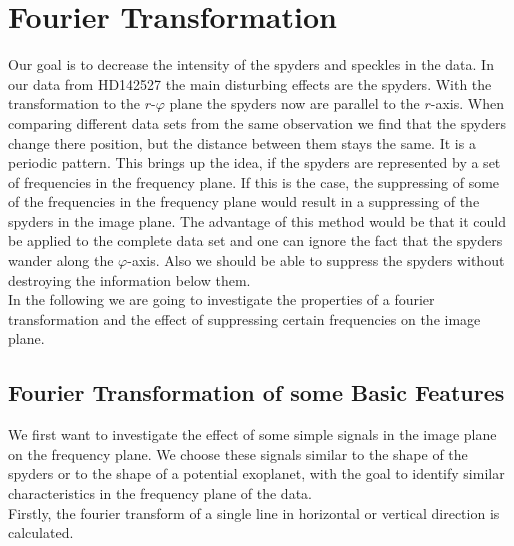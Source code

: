 \section{Fourier Transformation}
Our goal is to decrease the intensity of the spyders and speckles in the data. In our data from HD142527 the main disturbing effects are the spyders. With the transformation to the $r$-$\varphi$ plane the spyders now are parallel to the $r$-axis. When comparing different data sets from the same observation we find that the spyders change there position, but the distance between them stays the same. It is a periodic pattern. This brings up the idea, if the spyders are represented by a set of frequencies in the frequency plane. If this is the case, the suppressing of some of the frequencies in the frequency plane would result in a suppressing of the spyders in the image plane. The advantage of this method would be that it could be applied to the complete data set and one can ignore the fact that the spyders wander along the $\varphi$-axis. Also we should be able to suppress the spyders without destroying the information below them.\\
In the following we are going to investigate the properties of a fourier transformation and the effect of suppressing certain frequencies on the image plane.\\

\subsection{Fourier Transformation of some Basic Features}
We first want to investigate the effect of some simple signals in the image plane on the frequency plane. We choose these signals similar to the shape of the spyders or to the shape of a potential exoplanet, with the goal to identify similar characteristics in the frequency plane of the data.\\
Firstly, the fourier transform of a single line in horizontal or vertical direction is calculated.